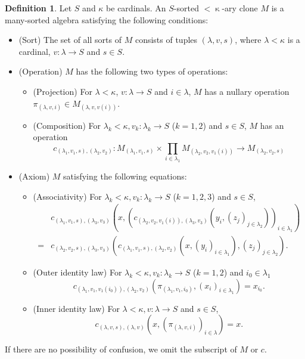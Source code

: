 \documentclass[a4paper,10pt]{article}
\theoremstyle{definition}
\newtheorem{df}{Definition}[section]
\newcommand\ra{\rightarrow}
\newcommand\mc{\mathclose}
\begin{document}
\begin{df}
Let $S$ and $\kappa$ be cardinals.
An $S$-sorted $<\mc\kappa$-ary clone $M$ is a many-sorted algebra
satisfying the following conditions:
\begin{itemize}
\item
(Sort) The set of all sorts of $M$ consists of tuples $(\lambda,v,s)$,
where $\lambda<\kappa$ is a cardinal, $v:\lambda\ra S$ and $s\in S$.
\item
(Operation) $M$ has the following two types of operations:
\begin{itemize}
\item
(Projection) For $\lambda<\kappa$, $v:\lambda\ra S$ and $i\in \lambda$,
$M$ has a nullary operation $\pi_{(\lambda,v,i)}\in M_{(\lambda,v,v(i))}$.
\item
(Composition) For $\lambda_k<\kappa, v_k:\lambda_k\ra S$ ($k=1,2$) and $s\in S$,
$M$ has an operation 
\[
c_{(\lambda_1,v_1,s),(\lambda_2,v_2)}:
  M_{(\lambda_1,v_1,s)}\times \prod_{i\in\lambda_1}M_{(\lambda_2,v_2,v_1(i))}
  \ra M_{(\lambda_2,v_2,s)}
\]
\end{itemize}
\item
(Axiom) $M$ satisfying the following equations:
\begin{itemize}
\item
(Associativity) For $\lambda_k<\kappa,v_k:\lambda_k\ra S$ ($k=1,2,3$) and $s\in S$,
\begin{align*}
&c_{(\lambda_1,v_1,s),(\lambda_3,v_3)}(x,
  (c_{(\lambda_2,v_2,v_1(i)),(\lambda_3,v_3)}(y_i,(z_{j})_{j\in\lambda_2}))_{i\in\lambda_1})\\
=&
c_{(\lambda_2,v_2,s),(\lambda_3,v_3)}
(c_{(\lambda_1,v_1,s),(\lambda_2,v_2)}(x,(y_i)_{i\in\lambda_1}),
  (z_j)_{j\in\lambda_2}).
\end{align*}
\item
(Outer identity law) For $\lambda_k<\kappa,v_k:\lambda_k\ra S$ ($k=1,2$)
and $i_0\in\lambda_1$
\[
c_{(\lambda_1,v_1,v_1(i_0)),(\lambda_2,v_2)}
(\pi_{(\lambda_1,v_1,i_0)},(x_i)_{i\in\lambda_1})
=x_{i_0}.
\]
\item
(Inner identity law) For $\lambda<\kappa,v:\lambda\ra S$ and $s\in S$, 
\[
c_{(\lambda,v,s),(\lambda,v)}(x,(\pi_{(\lambda,v,i)})_{i\in\lambda})
=x.
\]
\end{itemize}
\end{itemize}
\end{df}
If there are no possibility of confusion, we omit the subscript of $M$ or $c$.
\end{document}
